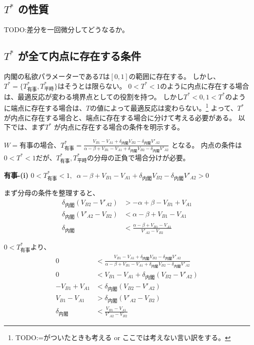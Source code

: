 \documentclass[main.tex]{subfiles}
\begin{document}
\subsection{$T^*$ の性質}

TODO:差分を一回微分してどうなるか。






\subsection{$T^*$ が全て内点に存在する条件}

内閣の私欲パラメーターである$T$は$[0,1]$の範囲に存在する。
しかし、$T^* = \lbrace T^*_{有事}, T^*_{平時} \rbrace$はそうとは限らない。
$0<T^*<1$のように内点に存在する場合は、最適反応が変わる境界点としての役割を持つ。
しかし$T^*<0,1<T^*$のように端点に存在する場合は、$T$の値によって最適反応は変わらない。\footnote{TODO:=がついたときも考える or ここでは考えない言い訳をする。}
よって、$T^*$が内点に存在する場合と、端点に存在する場合に分けて考える必要がある。
以下では、まず$T^*$ が内点に存在する場合の条件を明示する。


$W=有事$の場合、$T^*_{有事} = \frac{ V_{B1} - V_{A1} +\delta_{内閣}V_{B2} - \delta_{内閣}V'_{A2} }{ \alpha-\beta + V_{B1}-V_{A1} + \delta_{内閣}V_{B2} - \delta_{内閣}V'_{A2} }$
となる。
内点の条件は$0<T^*<1$だが、$T^*_{有事}, T^*_{平時}$の分母の正負で場合分けが必要。

\bigskip
\noindent
\textbf{有事-(i)}\; $0<T^*_{有事}<1,\;\; \alpha-\beta + V_{B1}-V_{A1} + \delta_{内閣}V_{B2} - \delta_{内閣}V'_{A2} > 0$

まず分母の条件を整理すると、
\begin{align*}
    \delta_{内閣}(V_{B2} - V'_{A2}) &> -\alpha+\beta - V_{B1}+V_{A1} \\
    \delta_{内閣}(V'_{A2} - V_{B2}) &< \alpha-\beta + V_{B1}-V_{A1}\\
    \delta_{内閣} &< \frac{\alpha-\beta + V_{B1}-V_{A1}}{V'_{A2} - V_{B2}}
\end{align*}

$0<T^*_{有事}$より、
\begin{align*}
    0 &< \frac{ V_{B1} - V_{A1} +\delta_{内閣}V_{B2} - \delta_{内閣}V'_{A2} }{ \alpha-\beta + V_{B1}-V_{A1} + \delta_{内閣}V_{B2} - \delta_{内閣}V'_{A2} }\\
    0 &<  V_{B1} - V_{A1} +\delta_{内閣}(V_{B2} - V'_{A2})\\
    -V_{B1} + V_{A1} &< \delta_{内閣}(V_{B2} - V'_{A2})\\
    V_{B1} - V_{A1} &> \delta_{内閣}(V'_{A2} - V_{B2})\\
    \delta_{内閣} &< \frac{V_{B1} - V_{A1}}{V'_{A2} - V_{B2}}
\end{align*}
\end{document}
